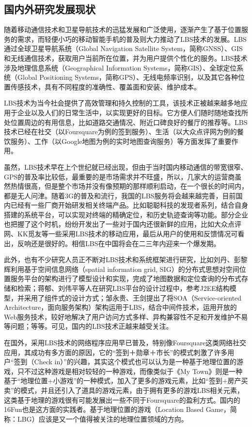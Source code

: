 \documentclass{article}
\begin{document}
\begin{CJK}{UTF8}{gbsn}
  \subsection{国内外研究发展现状}

  随着移动通信技术和卫星导航技术的迅猛发展和广泛使用，逐渐产生了基于位置服务的需求，而轻便小巧的移动智能手机的普及则大力推动了LBS技术的发展。LBS通过全球卫星导航系统（Global Navigation Satellite System，简称GNSS）、GIS和无线通信技术，获取用户当前所在位置，并为用户提供个性化的服务。LBS技术涉及地理信息系统（Geographical Information Systems，简称GIS）、全球定位系统（Global Positioning Systems，简称GPS）、无线电频率识别，以及其它各种位置传感技术，具有不同程度的准确性、覆盖面和安装、维护成本\cite{L02}。
  
  LBS技术为当今社会提供了高效管理和持久控制的工具，该技术正被越来越多地应用于企业以及人们的日常生活中，以实现更好的目标\cite{L01}。它方便人们随时随地查找所处位置周边的有用信息，比如道路交通情况、附近口碑良好的餐厅的推荐等。LBS技术已经在社交（以Foursquare为例的签到服务）、生活（以大众点评网为例的餐饮服务）、工作（以Google地图为例的实时地图查询服务）等方面发挥了重要作用。
  
  虽然，LBS技术早在上个世纪就已经出现，但由于当时国内移动通信的带宽很窄、GPS的普及率比较低，最重要的是市场需求并不旺盛，所以，几家大的运营商虽然热情很高，但是整个市场并没有像预期的那样顺利启动，在一个很长的时间内，都是无人问津。随着3G的普及和流行，我国的LBS服务将会越来越完善，目前国内已经有一些厂商开始研发相关终端产品。比如聪聪科技的发现者系列，结合自身搭建的系统平台，可以实现对终端的精确定位，和历史轨迹查询等功能。部分企业也把握了这个时机，纷纷开发出了一些对于国内还很新鲜的应用，比如大众点评网、KK觅友等一些采用LBS技术的移动应用，最后从用户的使用和反馈情况可看出，反响还是很好的。相信LBS在中国将会在二三年内迎来一个爆发期。

  此外，也有不少研究人员正不断对LBS技术和系统框架进行研究，比如刘丹、彭黎辉利用基于空间信息网络（spatial information grid, SIG）的分布式思想对空间位置服务平台的架构进行了模型设计和实现，完成了地图数据和定位查询的分布式存储和检索\cite{L08}；蒋郁、刘伟平等人在研究LBS平台的设计过程中，参考J2EE结构模型，并采用了组件式的设计方式\cite{L06}；邹永贵、王剑提出了将SOA（Service-oriented Architecture，面向服务架构）架构运用于LBS，结合中间件技术，运用开放的Web服务技术，较好地解决了用户访问方式多样、异构兼容性不足和开发维护不易等问题\cite{L09}；等等。可见，国内的LBS技术正越来越受关注。

  在国外，采用LBS技术的网络程序应用早已普及，特别像Foursquare这类网络社交应用，其成功有多方面的原因，它的“签到＋勋章＋市长”的模式刺激了许多用户“签到（Check in）”的兴趣，其实这个模式也可以认为是一种基于地理位置的游戏，只不过这种游戏是相对较轻的一种游戏，而像类似于《My Town》则是一种基于“地理位置+小游戏”的一种模式，加入了更多的游戏元素，比如“签到+房产买卖”的模式，并且还引入了道具的游戏元素，由于拥有更多的游戏LBS相关元素，这类基于地理的游戏很有可能发展出一些不同于Foursquare的盈利方式。国内的16Fun也是这方面的实践者。基于地理位置的游戏（Location Based Game，简称：LBG）应该是又一个值得被关注的地理位置领域的方向。


\end{CJK}
\end{document}
